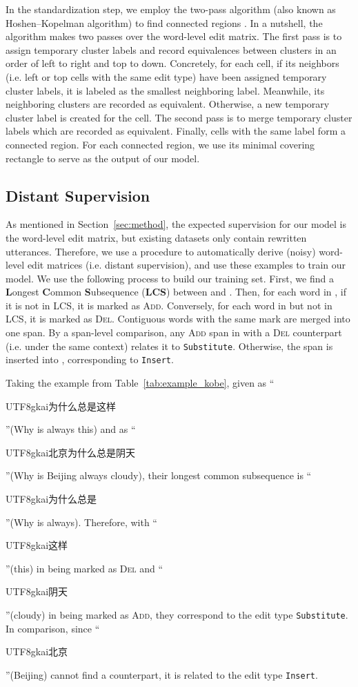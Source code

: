 \documentclass[11pt,a4paper]{article}
\newcommand{\chinese}[1]{\begin{CJK*}{UTF8}{gkai}{#1}\end{CJK*}}
\begin{document}
In the standardization step, we employ the two-pass algorithm (also known as Hoshen–Kopelman algorithm) to find connected regions \cite{cluster_algorithm_1976}. In a nutshell, the algorithm makes two passes over the word-level edit matrix. The first pass is to assign temporary cluster labels and record equivalences between clusters in an order of left to right and top to down. Concretely, for each cell, if its neighbors (i.e. left or top cells with the same edit type) have been assigned temporary cluster labels, it is labeled as the smallest neighboring label. Meanwhile, its neighboring clusters are recorded as equivalent. Otherwise, a new temporary cluster label is created for the cell. The second pass is to merge temporary cluster labels which are recorded as equivalent. Finally, cells with the same label form a connected region. For each connected region, we use its minimal covering rectangle to serve as the output of our model.

\subsection{Distant Supervision}

As mentioned in Section~\ref{sec:method}, the expected supervision for our model is the word-level edit matrix, but existing datasets only contain rewritten utterances. Therefore, we use a procedure to automatically derive (noisy) word-level edit matrices (i.e. distant supervision), and use these examples to train our model. We use the following process to build our training set. First, we find a \textbf{L}ongest \textbf{C}ommon \textbf{S}ubsequence (\textbf{LCS}) between  and . Then, for each word in , if it is not in LCS, it is marked as \textsc{Add}. Conversely, for each word in  but not in LCS, it is marked as \textsc{Del}. Contiguous words with the same mark are merged into one span. By a span-level comparison, any \textsc{Add} span in  with a \textsc{Del} counterpart (i.e. under the same context) relates it to {\small\texttt{Substitute}}. Otherwise, the span is inserted into , corresponding to {\small\texttt{Insert}}.

Taking the example from Table~\ref{tab:example_kobe}, given  as ``\chinese{为什么总是这样}''(Why is always this) and  as ``\chinese{北京为什么总是阴天}''(Why is Beijing always cloudy), their longest common subsequence is ``\chinese{为什么总是}''(Why is always). Therefore, with ``\chinese{这样}''(this) in  being marked as \textsc{Del} and ``\chinese{阴天}''(cloudy) in  being marked as \textsc{Add}, they correspond to the edit type {\small\texttt{Substitute}}. In comparison, since ``\chinese{北京}''(Beijing) cannot find a counterpart, it is related to the edit type {\small\texttt{Insert}}.
\end{document}
